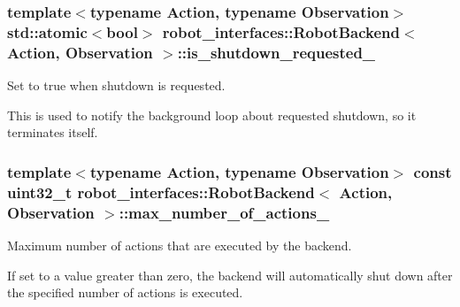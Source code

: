 \subsubsection[{\texorpdfstring{is\+\_\+shutdown\+\_\+requested\+\_\+}{is_shutdown_requested_}}]{\setlength{\rightskip}{0pt plus 5cm}template$<$typename Action, typename Observation$>$ std\+::atomic$<$bool$>$ {\bf robot\+\_\+interfaces\+::\+Robot\+Backend}$<$ {\bf Action}, {\bf Observation} $>$\+::is\+\_\+shutdown\+\_\+requested\+\_\+\hspace{0.3cm}{\ttfamily [private]}}\hypertarget{classrobot__interfaces_1_1RobotBackend_abe24206dcf102b33f8ee472e287f485a}{}\label{classrobot__interfaces_1_1RobotBackend_abe24206dcf102b33f8ee472e287f485a}


Set to true when shutdown is requested. 

This is used to notify the background loop about requested shutdown, so it terminates itself. 
\subsubsection[{\texorpdfstring{max\+\_\+number\+\_\+of\+\_\+actions\+\_\+}{max_number_of_actions_}}]{\setlength{\rightskip}{0pt plus 5cm}template$<$typename Action, typename Observation$>$ const uint32\+\_\+t {\bf robot\+\_\+interfaces\+::\+Robot\+Backend}$<$ {\bf Action}, {\bf Observation} $>$\+::max\+\_\+number\+\_\+of\+\_\+actions\+\_\+\hspace{0.3cm}{\ttfamily [private]}}\hypertarget{classrobot__interfaces_1_1RobotBackend_a7cac555549bff96a32da042a97919d47}{}\label{classrobot__interfaces_1_1RobotBackend_a7cac555549bff96a32da042a97919d47}


Maximum number of actions that are executed by the backend. 

If set to a value greater than zero, the backend will automatically shut down after the specified number of actions is executed. 
